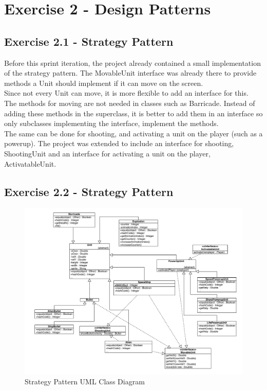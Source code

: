 \section{Exercise 2 - Design Patterns}
\subsection{Exercise 2.1 - Strategy Pattern}
Before this sprint iteration, the project already contained a small implementation of the strategy pattern. The MovableUnit interface was already there to provide methods a Unit should implement if it can move on the screen.\\

Since not every Unit can move, it is more flexible to add an interface for this. 
The methods for moving are not needed in classes such as Barricade. 
Instead of adding these methods in the superclass, it is better to add them in an interface so only subclasses implementing the interface, implement the methods.\\

The same can be done for shooting, and activating a unit on the player (such as a powerup).
The project was extended to include an interface for shooting, ShootingUnit and an interface for activating a unit on the player, ActivatableUnit. 

\subsection{Exercise 2.2 - Strategy Pattern}

\begin{figure}[ht!]
\centering
\includegraphics[width=15cm]{SI-UMLunitStrategy.pdf}
\caption{Strategy Pattern UML Class Diagram}
\label{fig:2-2strategy}
\end{figure}

